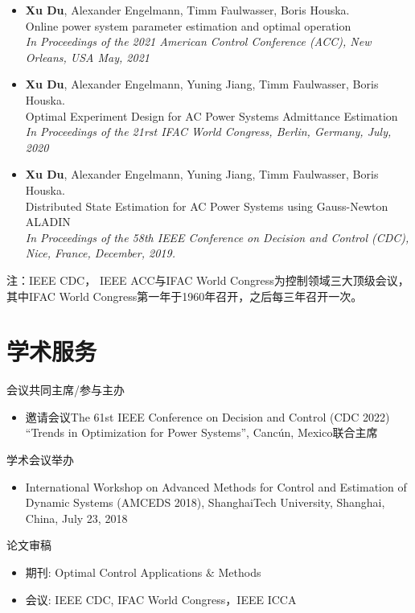 \documentclass[paper=a4,fontsize=11pt]{scrartcl} %
\newcommand{\NewPart}[1]{\section*{\uppercase{#1}}}
\newcommand{\EducationEntry}[4]{
		\noindent \textbf{#1} \hfill      %
		\colorbox{White}{%
			\parbox{5cm}{%
			\hfill\color{Black}#2}} \par  %
		\noindent \textit{#3} \par        %
		\noindent\hangindent=2em\hangafter=0 \small #4 %
		\normalsize \par}
\begin{document}
\begin{CJK*}{UTF8}{gbsn}
\begin{itemize}
	\item  { \textbf{Xu Du}, Alexander Engelmann, Timm Faulwasser, Boris Houska. \\
		{Online power system parameter estimation and optimal operation}\\
		\emph{In Proceedings of the 2021 American Control Conference (ACC), New Orleans, USA May, 2021
	} }
	
		\item  {\textbf{Xu Du}, Alexander Engelmann, Yuning Jiang, Timm Faulwasser, Boris Houska. \\
		Optimal Experiment Design for AC Power Systems Admittance Estimation\\
		\emph{In Proceedings of the 21rst IFAC World Congress, Berlin, Germany, July, 2020
		} }
	
	\item  {\textbf{Xu Du}, Alexander Engelmann, Yuning Jiang, Timm Faulwasser, Boris Houska. \\
		Distributed State Estimation for AC Power Systems using Gauss-Newton ALADIN \\
		 \emph{In Proceedings of the 58th IEEE Conference on Decision and Control (CDC),
		Nice, France, December, 2019.} }
\end{itemize}
注：IEEE CDC， IEEE ACC与IFAC World Congress为控制领域三大顶级会议，其中IFAC World Congress第一年于1960年召开，之后每三年召开一次。
\NewPart{学术服务}{会议共同主席/参与主办}
%
\begin{itemize}
	\item{邀请会议The 61st
		IEEE Conference on Decision and Control (CDC 2022)
		“Trends in Optimization for Power Systems”, Canc\'un, Mexico联合主席}
	\end{itemize}
{学术会议举办}
\begin{itemize}
\item{International Workshop on Advanced Methods for Control and Estimation of Dynamic
	Systems (AMCEDS 2018), ShanghaiTech University, Shanghai, China, July 23, 2018}
\end{itemize}
{论文审稿}
\begin{itemize}
	\item 期刊: Optimal Control Applications $\&$ Methods
	\item 会议: IEEE CDC, IFAC World Congress，IEEE ICCA
\end{itemize}


\end{CJK*}
\end{document}
